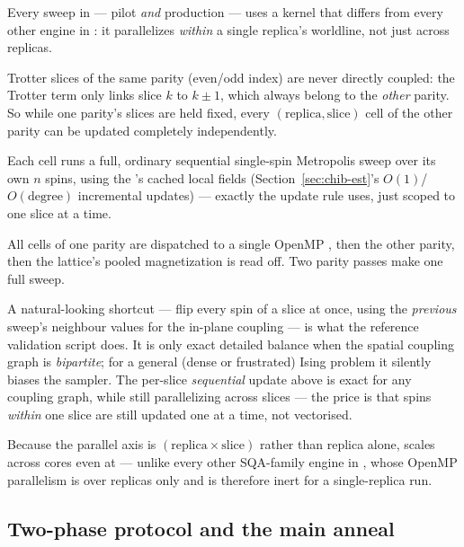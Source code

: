 Every sweep in  --- pilot \emph{and} production --- uses a
kernel that differs from every other engine in \qv{}: it parallelizes
\emph{within} a single replica's worldline, not just across replicas.

\begin{description}[style=nextline]
\item[The observation.] Trotter slices of the same parity (even/odd index)
are never directly coupled: the Trotter term only links slice $k$ to
$k\pm1$, which always belong to the \emph{other} parity. So while one
parity's slices are held fixed, every $(\text{replica},\text{slice})$ cell
of the other parity can be updated completely independently.
\item[The update.] Each cell runs a full, ordinary sequential single-spin
Metropolis sweep over its own $n$ spins, using the 's cached
local fields (Section~\ref{sec:chib-est}'s $O(1)$/$O(\text{degree})$
incremental updates) --- exactly the update rule  uses,
just scoped to one slice at a time.
\item[The parallelism.] All cells of one parity are dispatched to a single
OpenMP , then the other parity, then the
lattice's pooled magnetization is read off. Two parity passes make one
full sweep.
\end{description}

\begin{warnbox}
A natural-looking shortcut --- flip every spin of a slice at once, using
the \emph{previous} sweep's neighbour values for the in-plane coupling ---
is what the reference validation script does. It is only exact detailed
balance when the spatial coupling graph is \emph{bipartite}; for a general
(dense or frustrated) Ising problem it silently biases the sampler. The
per-slice \emph{sequential} update above is exact for any coupling graph,
while still parallelizing across slices --- the price is that spins
\emph{within} one slice are still updated one at a time, not vectorised.
\end{warnbox}

Because the parallel axis is $(\text{replica}\times\text{slice})$ rather
than replica alone,  scales across cores even at
 — unlike every other SQA-family engine in \qv{}, whose
OpenMP parallelism is over replicas only and is therefore inert for a
single-replica run.

\subsection{Two-phase protocol and the main anneal}

